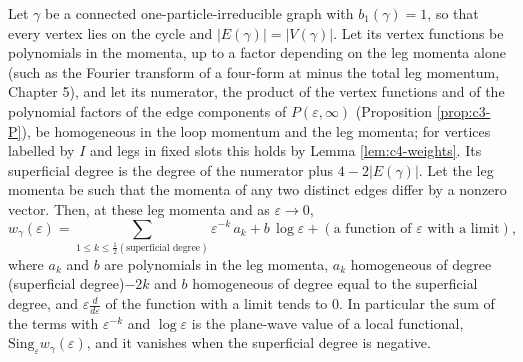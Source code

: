 \begin{lemma}
\label{lem:c4-local}
Let $\gamma$ be a connected one-particle-irreducible graph with $b_1(\gamma)=1$, so that every vertex lies on the cycle and $|E(\gamma)|=|V(\gamma)|$. Let its vertex functions be polynomials in the momenta, up to a factor depending on the leg momenta alone (such as the Fourier transform of a four-form at minus the total leg momentum, Chapter 5), and let its numerator, the product of the vertex functions and of the polynomial factors of the edge components of $P(\varepsilon,\infty)$ (Proposition \ref{prop:c3-P}), be homogeneous in the loop momentum and the leg momenta; for vertices labelled by $I$ and legs in fixed slots this holds by Lemma \ref{lem:c4-weights}. Its superficial degree is the degree of the numerator plus $4-2|E(\gamma)|$. Let the leg momenta be such that the momenta of any two distinct edges differ by a nonzero vector. Then, at these leg momenta and as $\varepsilon\to0$,
\[
w_\gamma(\varepsilon)=\sum_{1\le k\le\frac12(\text{superficial degree})}\varepsilon^{-k}\,a_k+b\,\log\varepsilon+(\text{a function of }\varepsilon\text{ with a limit}),
\]
where $a_k$ and $b$ are polynomials in the leg momenta, $a_k$ homogeneous of degree (superficial degree)$-2k$ and $b$ homogeneous of degree equal to the superficial degree, and $\varepsilon\frac{d}{d\varepsilon}$ of the function with a limit tends to $0$. In particular the sum of the terms with $\varepsilon^{-k}$ and $\log\varepsilon$ is the plane-wave value of a local functional, $\mathrm{Sing}_\varepsilon w_\gamma(\varepsilon)$, and it vanishes when the superficial degree is negative.
\end{lemma}

